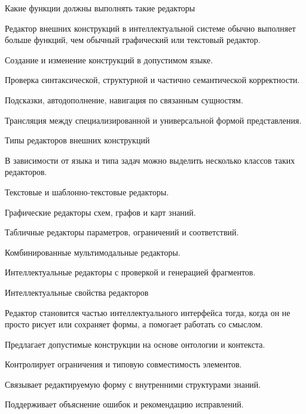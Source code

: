 \begin{frame}{Какие функции должны выполнять такие редакторы}
	\topline
	\justifying

	Редактор внешних конструкций в интеллектуальной системе обычно выполняет больше функций, чем обычный графический или текстовый редактор.
	
	\begin{textitemize}
		\item Создание и изменение конструкций в допустимом языке.
		\item Проверка синтаксической, структурной и частично семантической корректности.
		\item Подсказки, автодополнение, навигация по связанным сущностям.
		\item Трансляция между специализированной и универсальной формой представления.
	\end{textitemize}
\end{frame}

\begin{frame}{Типы редакторов внешних конструкций}
	\topline
	\justifying

	В зависимости от языка и типа задач можно выделить несколько классов таких редакторов.
	
	\begin{textitemize}
		\item Текстовые и шаблонно-текстовые редакторы.
		\item Графические редакторы схем, графов и карт знаний.
		\item Табличные редакторы параметров, ограничений и соответствий.
		\item Комбинированные мультимодальные редакторы.
		\item Интеллектуальные редакторы с проверкой и генерацией фрагментов.
	\end{textitemize}
\end{frame}

\begin{frame}{Интеллектуальные свойства редакторов}
	\topline
	\justifying

	Редактор становится частью интеллектуального интерфейса тогда, когда он не просто рисует или сохраняет формы, а помогает работать со смыслом.
	
	\begin{textitemize}
		\item Предлагает допустимые конструкции на основе онтологии и контекста.
		\item Контролирует ограничения и типовую совместимость элементов.
		\item Связывает редактируемую форму с внутренними структурами знаний.
		\item Поддерживает объяснение ошибок и рекомендацию исправлений.
	\end{textitemize}
\end{frame}

